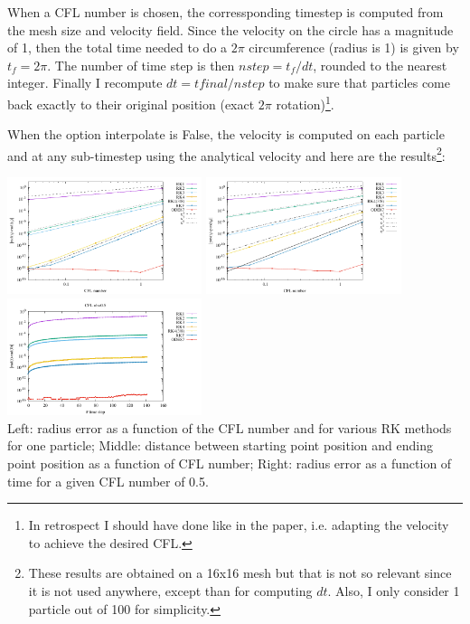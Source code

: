 When a CFL number is chosen, the corressponding timestep is computed from the mesh size and velocity field.
Since the velocity on the circle has a magnitude of 1, then the total time needed to do a $2\pi$ 
circumference (radius is 1) is given by $t_f=2 \pi$. The number of time step is then $nstep=t_f/dt$, rounded 
to the nearest integer. Finally I recompute $dt=tfinal/nstep$ to make sure that particles 
come back exactly to their original position (exact $2\pi$ rotation)\footnote{In retrospect I should
have done like in the paper, i.e. adapting the velocity to achieve the desired CFL.}.

When the option {\python interpolate} is False, the velocity is computed on each particle and at 
any sub-timestep using the analytical velocity and here are the results\footnote{These results are 
obtained on a 16x16 mesh but that is not so relevant since it is not used anywhere, except than 
for computing $dt$. Also, I only consider 1 particle out of 100 for simplicity.}:

\begin{center}
\includegraphics[width=5.7cm]{python_codes/fieldstone_122/results/exp1/errors.pdf}
\includegraphics[width=5.7cm]{python_codes/fieldstone_122/results/exp1/errors2.pdf}
\includegraphics[width=5.7cm]{python_codes/fieldstone_122/results/exp1/rad.pdf}\\
{\captionfont Left: radius error as a function of the CFL number and for various RK methods for 
one particle; Middle: distance between starting point position and ending point position as a function of CFL number; 
Right: radius error as a function of time for a given CFL number of 0.5.}
\end{center}

